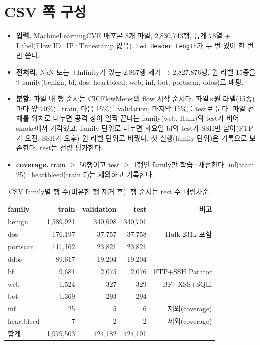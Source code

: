 \section{CSV 쪽 구성}
\begin{itemize}
\item \textbf{입력.} MachineLearningCVE 배포본 8개 파일, 2,830,743행, 통계 78열 + Label(Flow ID·IP·Timestamp 없음). \texttt{Fwd Header Length}가 두 번 있어 한 번만 쓴다.
\item \textbf{전처리.} NaN 또는 $\pm$Infinity가 있는 2,867행 제거 → 2,827,876행. 원 라벨 15종을 9 family(benign, bf, dos, heartbleed, web, inf, bot, portscan, ddos)로 매핑.
\item \textbf{분할.} 파일 내 행 순서는 CICFlowMeter의 flow 시작 순서다. 파일$\times$원 라벨(15종)마다 앞 70\%를 train, 다음 15\%를 validation, 마지막 15\%를 test로 둔다. 파일 전체를 위치로 나누면 공격 창이 일찍 끝나는 family(web, Hulk)의 test가 비어 smoke에서 기각했고, family 단위로 나누면 화요일 bf의 test가 SSH만 남아(FTP가 오전, SSH가 오후) 원 라벨 단위로 바꿨다. 첫 실행(family 단위)은 기록으로 보존한다. test는 전량 평가한다.
\item \textbf{coverage.} train $\ge$ 50행이고 test $\ge$ 1행인 family만 학습·채점한다. inf(train 25)·heartbleed(train 7)는 제외하고 기록한다.
\end{itemize}

\begin{table}[H]
\centering\small
\caption{CSV family별 행 수(비유한 행 제거 후). 행 순서는 test 수 내림차순.}
\begin{tabular}{lrrrr}
\toprule family & train & validation & test & 비고\\\midrule
benign & 1,589,921 & 340,698 & 340,701 & \\
dos & 176,197 & 37,757 & 37,758 & Hulk 231k 포함\\
portscan & 111,162 & 23,821 & 23,821 & \\
ddos & 89,617 & 19,204 & 19,204 & \\
bf & 9,681 & 2,075 & 2,076 & FTP+SSH Patator\\
web & 1,524 & 327 & 329 & BF+XSS+SQLi\\
bot & 1,369 & 293 & 294 & \\
inf & 25 & 5 & 6 & 제외(coverage)\\
heartbleed & 7 & 2 & 2 & 제외(coverage)\\\midrule
합계 & 1,979,503 & 424,182 & 424,191 & \\
\bottomrule
\end{tabular}
\end{table}

